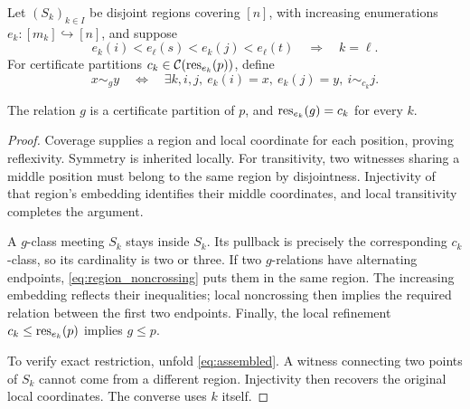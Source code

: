 Let $(S_k)_{k\in I}$ be disjoint regions covering $[n]$, with increasing
enumerations $e_k:[m_k]\hookrightarrow[n]$, and suppose
\begin{equation}\label{eq:region_noncrossing}
 e_k(i)<e_\ell(s)<e_k(j)<e_\ell(t)\quad\Longrightarrow\quad k=\ell.
\end{equation}
For certificate partitions $c_k\in\mathcal C(\operatorname{res}_{e_k}(p))$, define
\begin{equation}\label{eq:assembled}
 x\sim_g y\quad\Longleftrightarrow\quad
 \exists k,i,j,\ e_k(i)=x,\ e_k(j)=y,\ i\sim_{c_k}j.
\end{equation}
\begin{lemma}\label{lem:region_assembly}
The relation $g$ is a certificate partition of $p$, and
$\operatorname{res}_{e_k}(g)=c_k$ for every $k$.
\leanok
{}
\end{lemma}
\begin{proof}
Coverage supplies a region and local coordinate for each position, proving
reflexivity. Symmetry is inherited locally. For transitivity, two witnesses
sharing a middle position must belong to the same region by disjointness.
Injectivity of that region's embedding identifies their middle coordinates,
and local transitivity completes the argument.

A $g$-class meeting $S_k$ stays inside $S_k$. Its pullback is precisely the
corresponding $c_k$-class, so its cardinality is two or three. If two
$g$-relations have alternating endpoints, \eqref{eq:region_noncrossing} puts
them in the same region. The increasing embedding reflects their inequalities;
local noncrossing then implies the required relation between the first two
endpoints. Finally, the local refinement $c_k\leq\operatorname{res}_{e_k}(p)$ implies
$g\leq p$.

To verify exact restriction, unfold \eqref{eq:assembled}. A witness connecting
two points of $S_k$ cannot come from a different region. Injectivity then
recovers the original local coordinates. The converse uses $k$ itself.
\leanok
\end{proof}


